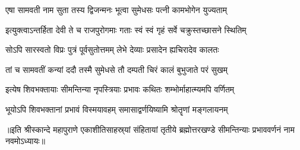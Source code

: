 \twolineshloka
{एषा सामवती नाम सुता तस्य द्विजन्मनः}
{भूत्वा सुमेधसः पत्नी कामभोगेन युज्यताम्} %

\twolineshloka
{इत्युक्त्वाऽन्तर्हिता देवी ते च राजपुरोगमाः}
{गताः स्वं स्वं गृहं सर्वे चक्रुस्तच्छासने स्थितिम्} %

\twolineshloka
{सोऽपि सारस्वतो विप्रः पुत्रं पूर्वसुतोत्तमम्}
{लेभे देव्याः प्रसादेन ह्यचिरादेव कालतः} %

\twolineshloka
{तां च सामवतीं कन्यां ददौ तस्मै सुमेधसे}
{तौ दम्पती चिरं कालं बुभुजाते परं सुखम्} %

\twolineshloka
{इत्येष शिवभक्तायाः सीमन्तिन्या नृपस्त्रियाः}
{प्रभावः कथितः शम्भोर्माहात्म्यमपि वर्णितम्} %

\twolineshloka
{भूयोऽपि शिवभक्तानां प्रभावं विस्मयावहम्}
{समासाद्वर्णयिष्यामि श्रोतॄणां मङ्गलायनम्} %

{॥इति श्रीस्कान्दे महापुराणे एकाशीतिसाहस्र्यां संहितायां तृतीये ब्रह्मोत्तरखण्डे सीमन्तिन्याः प्रभाववर्णनं नाम नवमोऽध्यायः॥} 

